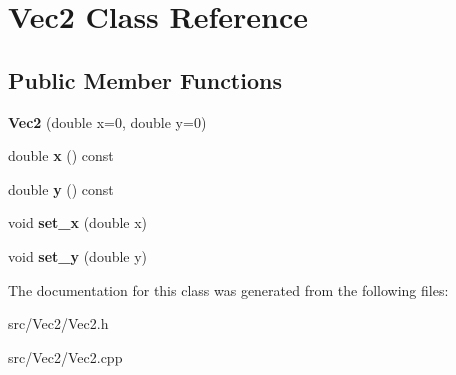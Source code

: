 \hypertarget{classVec2}{\section{\-Vec2 \-Class \-Reference}
\label{classVec2}
}
\subsection*{\-Public \-Member \-Functions}
\begin{DoxyCompactItemize}
\item 
\hypertarget{classVec2_a5b24bb1110ba995a3c31f20aeefeeddb}{{\bfseries \-Vec2} (double x=0, double y=0)}\label{classVec2_a5b24bb1110ba995a3c31f20aeefeeddb}

\item 
\hypertarget{classVec2_a1a375ab5fdf12bcf7989746890c945c5}{double {\bfseries x} () const }\label{classVec2_a1a375ab5fdf12bcf7989746890c945c5}

\item 
\hypertarget{classVec2_a89affe6ea0f55d7783cb9e9ad8ca6dee}{double {\bfseries y} () const }\label{classVec2_a89affe6ea0f55d7783cb9e9ad8ca6dee}

\item 
\hypertarget{classVec2_af17b80871d29e513c0b53d541a7ec5d1}{void {\bfseries set\-\_\-x} (double x)}\label{classVec2_af17b80871d29e513c0b53d541a7ec5d1}

\item 
\hypertarget{classVec2_adf5b21e7412f71198c8d15545f49f2ac}{void {\bfseries set\-\_\-y} (double y)}\label{classVec2_adf5b21e7412f71198c8d15545f49f2ac}

\end{DoxyCompactItemize}


\-The documentation for this class was generated from the following files\-:\begin{DoxyCompactItemize}
\item 
src/\-Vec2/\-Vec2.\-h\item 
src/\-Vec2/\-Vec2.\-cpp\end{DoxyCompactItemize}
